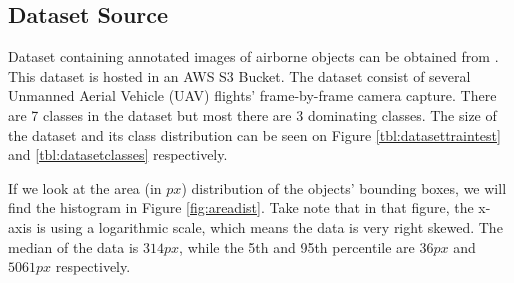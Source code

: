  \subsection{Dataset Source}
  \label{section:datasetsource}
  Dataset containing annotated images of airborne objects can be obtained from \textcite{aot_dataset}.
  This dataset is hosted in an AWS S3 Bucket.
  The dataset consist of several Unmanned Aerial Vehicle (UAV) flights' frame-by-frame camera capture.
  There are 7 classes in the dataset but most there are 3 dominating classes.
  The size of the dataset and its class distribution can be seen on Figure \ref{tbl:datasettraintest} and
  \ref{tbl:datasetclasses} respectively.
  \begin{table}[H]
    \centering
    \label{tbl:datasettraintest}
    
  \end{table}
  \begin{table}[H]
    \centering
    \label{tbl:datasetclasses}
    
  \end{table}
  If we look at the area (in $px$) distribution of the objects' bounding boxes, we will find
  the histogram in Figure \ref{fig:areadist}. Take note that in that figure, the x-axis is 
  using a logarithmic scale, which means the data is very right skewed.
  The median of the data is $314 px$, while the 5th and 95th percentile are $36 px$ and $5061 px$ respectively.

